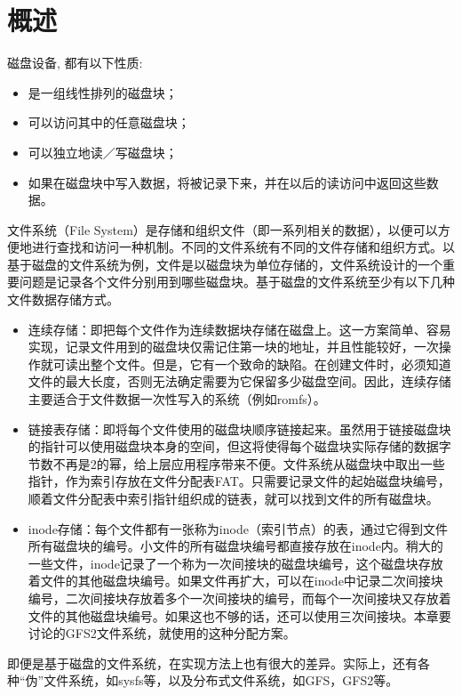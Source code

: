 \chapter{概述}
\label{chapter:intro}

磁盘设备, 都有以下性质:
\begin{itemize}
	\item 是一组线性排列的磁盘块；
	\item 可以访问其中的任意磁盘块；
	\item 可以独立地读／写磁盘块；
	\item 如果在磁盘块中写入数据，将被记录下来，并在以后的读访问中返回这些数据。
\end{itemize}

文件系统（File System）是存储和组织文件（即一系列相关的数据），以便可以方便地进行查找和访问一种机制。不同的文件系统有不同的文件存储和组织方式。以基于磁盘的文件系统为例，文件是以磁盘块为单位存储的，文件系统设计的一个重要问题是记录各个文件分别用到哪些磁盘块。基于磁盘的文件系统至少有以下几种文件数据存储方式。
\begin{itemize}
	\item 连续存储：即把每个文件作为连续数据块存储在磁盘上。这一方案简单、容易实现，记录文件用到的磁盘块仅需记住第一块的地址，并且性能较好，一次操作就可读出整个文件。但是，它有一个致命的缺陷。在创建文件时，必须知道文件的最大长度，否则无法确定需要为它保留多少磁盘空间。因此，连续存储主要适合于文件数据一次性写入的系统（例如romfs）。
	\item 链接表存储：即将每个文件使用的磁盘块顺序链接起来。虽然用于链接磁盘块的指针可以使用磁盘块本身的空间，但这将使得每个磁盘块实际存储的数据字节数不再是2的幂，给上层应用程序带来不便。文件系统从磁盘块中取出一些指针，作为索引存放在文件分配表FAT。只需要记录文件的起始磁盘块编号，顺着文件分配表中索引指针组织成的链表，就可以找到文件的所有磁盘块。
	\item inode存储：每个文件都有一张称为inode（索引节点）的表，通过它得到文件所有磁盘块的编号。小文件的所有磁盘块编号都直接存放在inode内。稍大的一些文件，inode记录了一个称为一次间接块的磁盘块编号，这个磁盘块存放着文件的其他磁盘块编号。如果文件再扩大，可以在inode中记录二次间接块编号，二次间接块存放着多个一次间接块的编号，而每个一次间接块又存放着文件的其他磁盘块编号。如果这也不够的话，还可以使用三次间接块。本章要讨论的GFS2文件系统，就使用的这种分配方案。
\end{itemize}

即便是基于磁盘的文件系统，在实现方法上也有很大的差异。实际上，还有各种``伪''文件系统，如sysfs等，以及分布式文件系统，如GFS，GFS2等。

